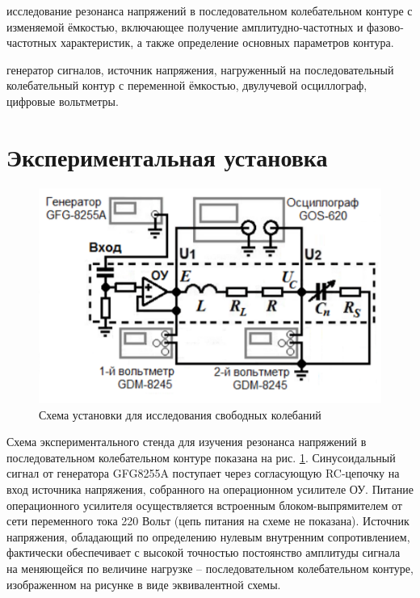 \documentclass[a4paper,14pt]{article}
\begin{document}
\author{Рябых Владислав и Исыпов Илья, Б05-905}
\title{}
\maketitle

 исследование резонанса напряжений в последовательном колебательном контуре с изменяемой ёмкостью, включающее получение амплитудно-частотных и фазово-частотных характеристик, а также определение основных параметров контура.

 генератор сигналов, источник напряжения, нагруженный на последовательный колебательный контур с переменной ёмкостью, двулучевой осциллограф, цифровые вольтметры.


\section*{Экспериментальная установка}

\begin{center}
	\begin{figure}[bhtp]
		\centering
		\includegraphics[width=0.7\linewidth]{scheme.png}
		\caption{Схема установки для исследования свободных колебаний}
		\label{scheme}
	\end{figure}
\end{center}


Схема экспериментального стенда для изучения резонанса напряжений в последовательном колебательном контуре показана на рис. \ref{scheme}. Синусоидальный сигнал от генератора GFG8255A поступает через согласующую RC-цепочку на вход источника напряжения, собранного на операционном усилителе ОУ. Питание операционного усилителя осуществляется
встроенным блоком-выпрямителем от сети переменного тока 220 Вольт (цепь питания на
схеме не показана). Источник напряжения, обладающий по определению нулевым внутренним сопротивлением, фактически обеспечивает с высокой точностью постоянство амплитуды сигнала на меняющейся по величине нагрузке – последовательном колебательном контуре, изображенном на рисунке в виде эквивалентной схемы.
\end{document}
